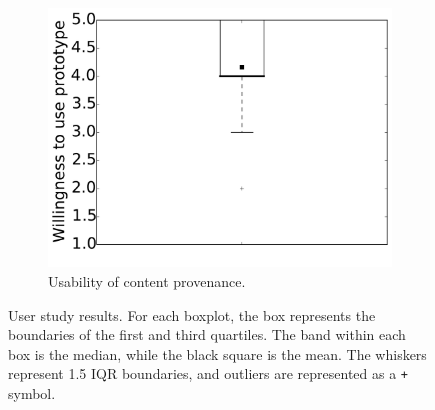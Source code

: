 \begin{figure}[t]
\begin{subfigure}[t]{0.32\textwidth}
    \end{subfigure}
    \hfill
    \begin{subfigure}[t]{0.32\textwidth}
        \includegraphics[width=\textwidth]{adinjection/figures/user_study/willingness.pdf}
        \caption{\scriptsize{Usability of content provenance.}}
        \label{adinjection:fig:eval:user_study:usability}
    \end{subfigure}
    \caption{User study results. For each boxplot, the box represents the
    boundaries of the first and third quartiles. The band within each box
    is the median, while the black square is the mean. The whiskers represent
    1.5 IQR boundaries, and outliers are represented as a \texttt{+} symbol.}
    \label{adinjection:fig:eval:user_study}
\end{figure}
